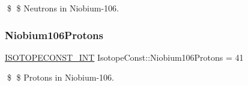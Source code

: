 \$ \$ Neutrons in Niobium-\/106. \mbox{\label{group___isotope_const-_niobium-_nb106_ga22700db3a033d29899342c83f428b564}} 
\subsubsection{\texorpdfstring{Niobium106\+Protons}{Niobium106Protons}}
{\footnotesize\ttfamily \mbox{\hyperlink{group___isotope_const-_macros_ga5f18360b3e99483a35c32d789e62621c}{I\+S\+O\+T\+O\+P\+E\+C\+O\+N\+S\+T\+\_\+\+I\+NT}} Isotope\+Const\+::\+Niobium106\+Protons = 41}

\$ \$ Protons in Niobium-\/106. 